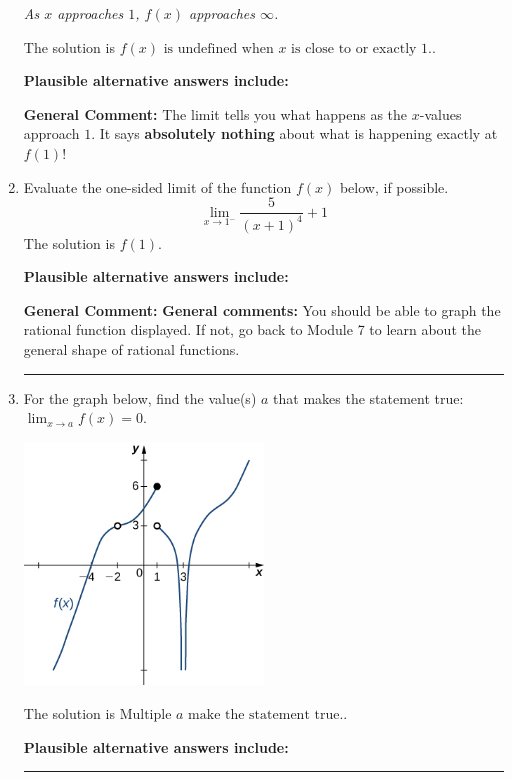 \documentclass{extbook}[14pt]
\newcommand{\litem}[1]{\item #1

\rule{\textwidth}{0.4pt}}
\begin{document}
\begin{enumerate}
{\begin{center}
    \textit{ As $x$ approaches $1$, $f(x)$ approaches $\infty$. }
\end{center}
The solution is \( f(x) \text{ is undefined when } x \text{ is close to or exactly } 1. \).\begin{enumerate}[label=\Alph*.]
\textbf{Plausible alternative answers include:}




\end{enumerate}

\textbf{General Comment:} The limit tells you what happens as the $x$-values approach $1$. It says \textbf{absolutely nothing} about what is happening exactly at $f(1)$!
}
\litem{
Evaluate the one-sided limit of the function $f(x)$ below, if possible.
\[ \lim_{x \rightarrow 1^-} \frac{5}{(x+1)^4}+1 \]The solution is \( f(1) \).\begin{enumerate}[label=\Alph*.]
\textbf{Plausible alternative answers include:}




\end{enumerate}

\textbf{General Comment:} \textbf{General comments:} You should be able to graph the rational function displayed. If not, go back to Module 7 to learn about the general shape of rational functions.
}
\litem{
For the graph below, find the value(s) $a$ that makes the statement true: $ \displaystyle \lim_{x \rightarrow a} f(x) = 0$.

\begin{center}
    \includegraphics[width=0.5\textwidth]{../Figures/evaluateLimitGraphicallyCopyB.png}
\end{center}


The solution is \( \text{Multiple } a \text{ make the statement true}. \).\begin{enumerate}[label=\Alph*.]
\textbf{Plausible alternative answers include:}





\end{enumerate}}
\end{enumerate}
\end{document}

